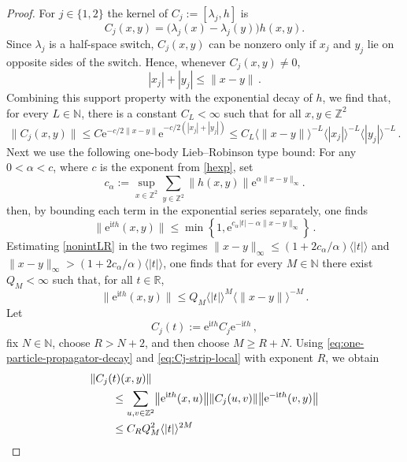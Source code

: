 \documentclass[a4paper]{article}
\newcommand{\e}{\mathrm{e}}
\renewcommand{\i}{\mathrm{i}}
\newcommand{\N}{\mathbb{N}}
\newcommand{\Z}{\mathbb{Z}}
\newcommand{\R}{\mathbb{R}}
\theoremstyle{plain}
\theoremstyle{definition}
\theoremstyle{remark}
\renewcommand{\(}{\left(}
\renewcommand{\)}{\right)}
\begin{document}
\begin{proof}
For $j\in\{1,2\}$ the kernel of 
$C_j:=[\lambda_j,h]$  is
\[
    C_j(x,y)
    =
    \bigl(\lambda_j(x)-\lambda_j(y)\bigr)h(x,y).
\]
Since $\lambda_j$ is a half-space switch, $C_j(x,y)$ can be nonzero only
if $x_j$ and $y_j$ lie on opposite sides of the switch. Hence, whenever
$C_j(x,y)\neq0$,
\[
    |x_j|+|y_j|
    \le
    \|x-y\|\, .
\]
Combining this support property with the exponential decay of $h$, we find
that, for every $L\in\N$, there is a constant $C_L<\infty$ such that for all $x,y\in\Z^2$
\begin{equation}\label{eq:Cj-strip-local}
    \|C_j(x,y)\|
    \leq
    C\e^{-c/2\|x-y\|}\e^{-c/2(|x_j|+|y_j|)}
    \leq C_L
    \langle \|x-y\|\rangle^{-L}
    \langle |x_j|\rangle^{-L}
    \langle |y_j|\rangle^{-L}\,.
\end{equation}
 Next we use the following one-body Lieb--Robinson type bound: For any $0<\alpha<c$, where $c$ is the exponent from \eqref{hexp}, set
\[
  c_\alpha
  :=
  \sup_{x\in\Z^2}\sum_{y\in\Z^{2}}
  \|h(x,y)\|\e^{\alpha\|x-y\|_\infty}.
\]
then, by   bounding each term in the exponential series separately, one finds
\begin{equation}\label{nonintLR}
\bigl\|\e^{\i t h}(x,y)\bigr\|\leq \min\left\{1,\e^{c_\alpha|t|- \alpha \|x-y\|_\infty}\right\}\,.
\end{equation}
Estimating \eqref{nonintLR} in the two regimes $\|x-y\|_\infty \leq (1+ 2c_\alpha/\alpha)\langle |t|\rangle $ and 
$\|x-y\|_\infty > (1+ 2c_\alpha/\alpha)\langle |t|\rangle $, one  finds that 
for every $M\in\N$ there exist $Q_M<\infty$ such that, for
all $t\in\R$,
\begin{equation}\label{eq:one-particle-propagator-decay}
    \bigl\|\e^{\i t h}(x,y)\bigr\|
    \le
    Q_M
    \langle |t|\rangle^{M}
    \langle \|x-y\|\rangle^{-M}\,.
\end{equation}
Let
\[
    C_j(t):=\e^{\i t h}C_j\e^{-\i t h}\,,
\]
fix $N\in\N$, choose $R>N+2$, and then choose $M\geq R+N$. Using
\eqref{eq:one-particle-propagator-decay} and
\eqref{eq:Cj-strip-local} with exponent $R$, we obtain
\begin{align*}
    \hspace{2em}&\hspace{-2em}
    \|C_j(t)(x,y)\|
    \\
    &\leq
    \sum_{u,v\in\Z^2}
    \bigl\|\e^{\i t h}(x,u)\bigr\|
    \|C_j(u,v)\|
    \bigl\|\e^{-\i t h}(v,y)\bigr\|                                      \\
    &\le
    C_RQ_M^2\langle |t|\rangle^{2 M}

\end{align*}
\end{proof}
\end{document}
